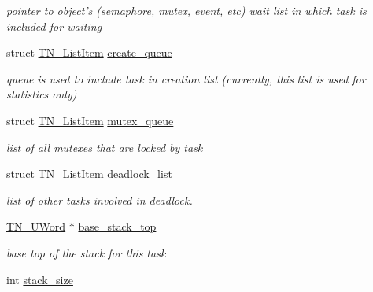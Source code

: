 \begin{DoxyCompactItemize}
\begin{DoxyCompactList}\small\item\em pointer to object's (semaphore, mutex, event, etc) wait list in which task is included for waiting \end{DoxyCompactList}\item 
\hypertarget{structTN__Task_aedb23df723d259530f10a122fec42334}{struct \hyperlink{structTN__ListItem}{T\+N\+\_\+\+List\+Item} \hyperlink{structTN__Task_aedb23df723d259530f10a122fec42334}{create\+\_\+queue}}\label{structTN__Task_aedb23df723d259530f10a122fec42334}

\begin{DoxyCompactList}\small\item\em queue is used to include task in creation list (currently, this list is used for statistics only) \end{DoxyCompactList}\item 
\hypertarget{structTN__Task_ad4decd7355c95a5b60a6774c3ee19eb9}{struct \hyperlink{structTN__ListItem}{T\+N\+\_\+\+List\+Item} \hyperlink{structTN__Task_ad4decd7355c95a5b60a6774c3ee19eb9}{mutex\+\_\+queue}}\label{structTN__Task_ad4decd7355c95a5b60a6774c3ee19eb9}

\begin{DoxyCompactList}\small\item\em list of all mutexes that are locked by task \end{DoxyCompactList}\item 
struct \hyperlink{structTN__ListItem}{T\+N\+\_\+\+List\+Item} \hyperlink{structTN__Task_a097e79851e01fb3c73f0346d99ea8b7e}{deadlock\+\_\+list}
\begin{DoxyCompactList}\small\item\em list of other tasks involved in deadlock. \end{DoxyCompactList}\item 
\hypertarget{structTN__Task_ab617b455f497c1bf497208e5afb8cc77}{\hyperlink{tn__arch__example_8h_ab80cba0fe9ffcd9011d53dfeb9e39bf4}{T\+N\+\_\+\+U\+Word} $\ast$ \hyperlink{structTN__Task_ab617b455f497c1bf497208e5afb8cc77}{base\+\_\+stack\+\_\+top}}\label{structTN__Task_ab617b455f497c1bf497208e5afb8cc77}

\begin{DoxyCompactList}\small\item\em base top of the stack for this task \end{DoxyCompactList}\item 
\hypertarget{structTN__Task_a18bd724533974648a39e965d10af83cb}{int \hyperlink{structTN__Task_a18bd724533974648a39e965d10af83cb}{stack\+\_\+size}}\label{structTN__Task_a18bd724533974648a39e965d10af83cb}


\end{DoxyCompactItemize}
